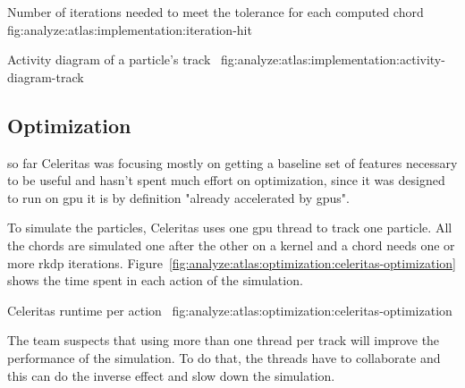 {Number of iterations needed to meet the tolerance for each computed chord}
{fig:analyze:atlas:implementation:iteration-hit}

{Activity diagram of a particle's track~\cite{atlas-week-esseiva}}
{fig:analyze:atlas:implementation:activity-diagram-track}

\subsection{Optimization}
\label{ch:analyze:atlas:optimization}

so far Celeritas was focusing mostly on getting a baseline set of features
necessary to be useful and hasn't spent much effort on optimization, since it
was designed to run on \acrshort{gpu} it is by definition "already accelerated
by \acrshort{gpu}s".

To simulate the particles, Celeritas uses one \acrshort{gpu} thread to track one particle.
All the chords are simulated one after the other on a kernel and a chord needs
one or more \acrshort{rkdp} iterations.
Figure~\ref{fig:analyze:atlas:optimization:celeritas-optimization} shows
the time spent in each action of the simulation.

{Celeritas runtime per action~\cite{chep2023-presentation-johnson}}
{fig:analyze:atlas:optimization:celeritas-optimization}

The team suspects that using more than one thread per track will improve the
performance of the simulation.
To do that, the threads have to collaborate and this can do the inverse effect
and slow down the simulation.


